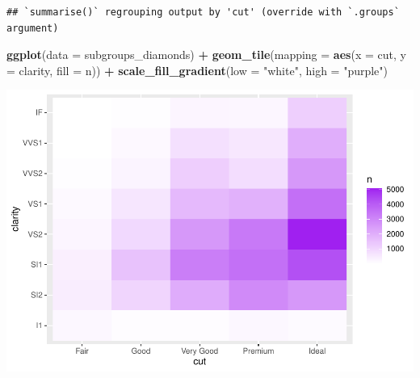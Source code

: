 \documentclass[
]{book}
\newenvironment{Shaded}{\begin{snugshade}}{\end{snugshade}}
\newcommand{\CommentTok}[1]{\textcolor[rgb]{0.56,0.35,0.01}{\textit{#1}}}
\newcommand{\DataTypeTok}[1]{\textcolor[rgb]{0.13,0.29,0.53}{#1}}
\newcommand{\KeywordTok}[1]{\textcolor[rgb]{0.13,0.29,0.53}{\textbf{#1}}}
\newcommand{\NormalTok}[1]{#1}
\newcommand{\OperatorTok}[1]{\textcolor[rgb]{0.81,0.36,0.00}{\textbf{#1}}}
\newcommand{\StringTok}[1]{\textcolor[rgb]{0.31,0.60,0.02}{#1}}
\begin{document}
\begin{Shaded}
\end{Shaded}

\begin{verbatim}
## `summarise()` regrouping output by 'cut' (override with `.groups` argument)
\end{verbatim}

\begin{Shaded}
\begin{Highlighting}[]
\KeywordTok{ggplot}\NormalTok{(}\DataTypeTok{data =}\NormalTok{ subgroups_diamonds) }\OperatorTok{+}\StringTok{ }\KeywordTok{geom_tile}\NormalTok{(}\DataTypeTok{mapping =} \KeywordTok{aes}\NormalTok{(}\DataTypeTok{x =}\NormalTok{ cut,}
    \DataTypeTok{y =}\NormalTok{ clarity, }\DataTypeTok{fill =}\NormalTok{ n)) }\OperatorTok{+}\StringTok{ }\KeywordTok{scale_fill_gradient}\NormalTok{(}\DataTypeTok{low =} \StringTok{"white"}\NormalTok{,}
    \DataTypeTok{high =} \StringTok{"purple"}\NormalTok{)}
\end{Highlighting}
\end{Shaded}

\includegraphics{_main_files/figure-latex/unnamed-chunk-258-3.pdf}

\begin{Shaded}
\end{Shaded}
\end{document}
